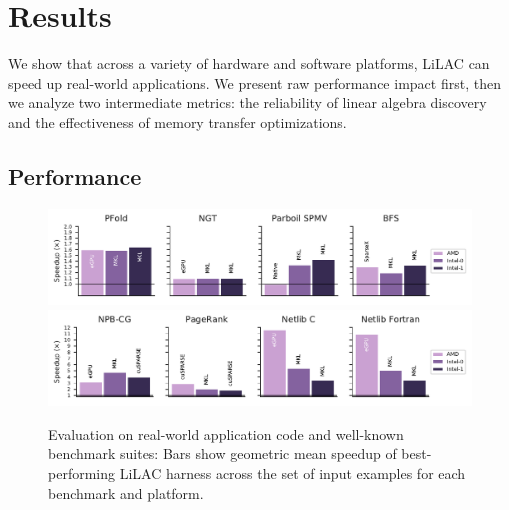 
\section{Results}
\label{sec:results}

We show that across a variety of hardware and software platforms, LiLAC can
speed up real-world applications.
We present raw performance impact first, then we analyze two intermediate
metrics: the reliability of linear algebra discovery and the effectiveness of
memory transfer optimizations.

\subsection{Performance}

\begin{figure}[t]
  \centering
  \includegraphics[width=\linewidth]{figures/baseline.pdf}
  \includegraphics[width=\linewidth]{figures/baseline_bench.pdf}
\\[-0.75em]
  \caption{Evaluation on real-world application code and well-known benchmark
          suites:
           Bars show geometric mean speedup of best-performing LiLAC harness across the
           set of input examples for each benchmark and platform. }
  \label{spmv_app_perf}
\end{figure}

